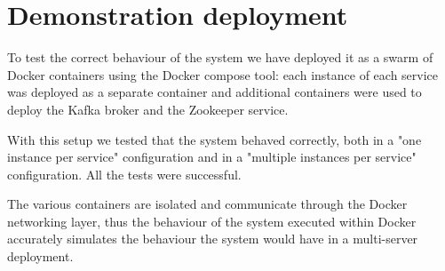 \documentclass{article}
\begin{document}
\section{Demonstration deployment}
To test the correct behaviour of the system we have deployed it as a swarm of Docker containers using the Docker compose tool: each instance of each service was deployed as a separate container and additional containers were used to deploy the Kafka broker and the Zookeeper service.

With this setup we tested that the system behaved correctly, both in a "one instance per service" configuration and in a "multiple instances per service" configuration. All the tests were successful.

The various containers are isolated and communicate through the Docker networking layer, thus the behaviour of the system executed within Docker accurately simulates the behaviour the system would have in a multi-server deployment.
\end{document}
